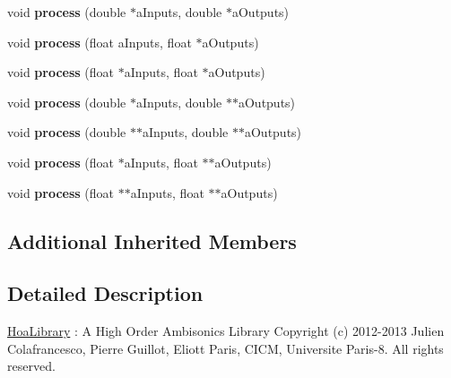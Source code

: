 \begin{DoxyCompactItemize}
\item 
\hypertarget{class_ambisonics_ring_modulation_a01935cefd40a22a74e77b0088931be2b}{void {\bfseries process} (double $\ast$a\-Inputs, double $\ast$a\-Outputs)}\label{class_ambisonics_ring_modulation_a01935cefd40a22a74e77b0088931be2b}

\item 
\hypertarget{class_ambisonics_ring_modulation_a1f2ef2520da7f2f6a9a459363ae7f35a}{void {\bfseries process} (float a\-Inputs, float $\ast$a\-Outputs)}\label{class_ambisonics_ring_modulation_a1f2ef2520da7f2f6a9a459363ae7f35a}

\item 
\hypertarget{class_ambisonics_ring_modulation_a14df064d9535f3acd981498f49e1f5b4}{void {\bfseries process} (float $\ast$a\-Inputs, float $\ast$a\-Outputs)}\label{class_ambisonics_ring_modulation_a14df064d9535f3acd981498f49e1f5b4}

\item 
\hypertarget{class_ambisonics_ring_modulation_a6bc07d756bf57a86aed2be12f9122b38}{void {\bfseries process} (double $\ast$a\-Inputs, double $\ast$$\ast$a\-Outputs)}\label{class_ambisonics_ring_modulation_a6bc07d756bf57a86aed2be12f9122b38}

\item 
\hypertarget{class_ambisonics_ring_modulation_add91a033406ecee996e4711d3886a573}{void {\bfseries process} (double $\ast$$\ast$a\-Inputs, double $\ast$$\ast$a\-Outputs)}\label{class_ambisonics_ring_modulation_add91a033406ecee996e4711d3886a573}

\item 
\hypertarget{class_ambisonics_ring_modulation_a28613c6364b419ad572990f9cd7c4c57}{void {\bfseries process} (float $\ast$a\-Inputs, float $\ast$$\ast$a\-Outputs)}\label{class_ambisonics_ring_modulation_a28613c6364b419ad572990f9cd7c4c57}

\item 
\hypertarget{class_ambisonics_ring_modulation_a55e04e61ba7deb41f9d90c16ec2bebef}{void {\bfseries process} (float $\ast$$\ast$a\-Inputs, float $\ast$$\ast$a\-Outputs)}\label{class_ambisonics_ring_modulation_a55e04e61ba7deb41f9d90c16ec2bebef}

\end{DoxyCompactItemize}
\subsection*{Additional Inherited Members}


\subsection{Detailed Description}
\hyperlink{interface_hoa_library}{Hoa\-Library} \-: A High Order Ambisonics Library Copyright (c) 2012-\/2013 Julien Colafrancesco, Pierre Guillot, Eliott Paris, C\-I\-C\-M, Universite Paris-\/8. All rights reserved.


